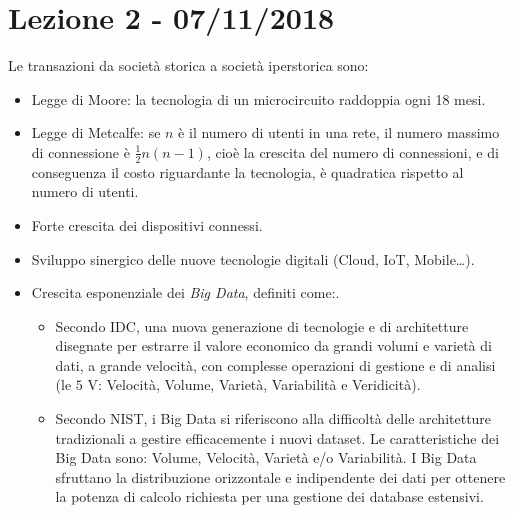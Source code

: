 \documentclass[a4page, 11pt]{article}
\begin{document}
\section*{Lezione 2 - 07/11/2018}
Le transazioni da società storica a società iperstorica sono:
\begin{itemize}
  \item Legge di Moore: la tecnologia di un microcircuito raddoppia ogni 18 mesi.
  \item Legge di Metcalfe: se $n$ è il numero di utenti in una rete, il numero massimo di connessione è $\frac{1}{2}n(n-1)$, cioè la crescita del numero di connessioni, e di conseguenza il costo riguardante la tecnologia, è quadratica rispetto al numero di utenti.
  \item Forte crescita dei dispositivi connessi.
  \item Sviluppo sinergico delle nuove tecnologie digitali (Cloud, IoT, Mobile\ldots).
  \item Crescita esponenziale dei \textit{Big Data}, definiti come:.
    \begin{itemize}
      \item Secondo IDC, una nuova generazione di tecnologie e di architetture disegnate per estrarre il valore economico da grandi volumi e varietà di dati, a grande velocità, con complesse operazioni di gestione e di analisi (le $5$ V: Velocità, Volume, Varietà, Variabilità e Veridicità).
      \item Secondo NIST, i Big Data si riferiscono alla difficoltà delle architetture tradizionali a gestire efficacemente i nuovi dataset. Le caratteristiche dei Big Data sono: Volume, Velocità, Varietà e/o Variabilità. I Big Data sfruttano la distribuzione orizzontale e indipendente dei dati per ottenere la potenza di calcolo richiesta per una gestione dei database estensivi. 
    \end{itemize}
\end{itemize}
\end{document}
